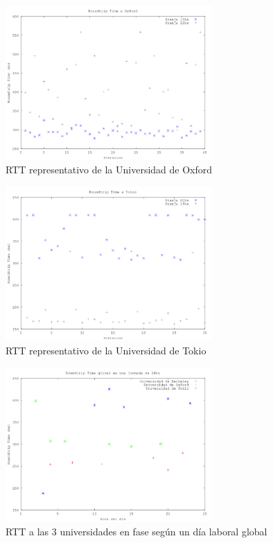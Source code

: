 \begin{figure}[h!]
  \centering
  \includegraphics[width=0.7\textwidth]{./figs/rtt_horarios_oxford.png}
  \caption{RTT representativo de la Universidad de Oxford}
  \label{fig:rtt-horarios-oxford}
\end{figure}

\begin{figure}[h!]
  \centering
  \includegraphics[width=0.7\textwidth]{./figs/rtt_horarios_tokyo.png}
  \caption{RTT representativo de la Universidad de Tokio}
  \label{fig:rtt-horarios-tokyo}
\end{figure}

\clearpage

\begin{figure}[t!]
  \centering
  \includegraphics[width=0.7\textwidth]{./figs/rtt_normalizado.png}
  \caption{RTT a las 3 universidades en fase según un día laboral global}
  \label{fig:rtt-normalizado}
\end{figure}



